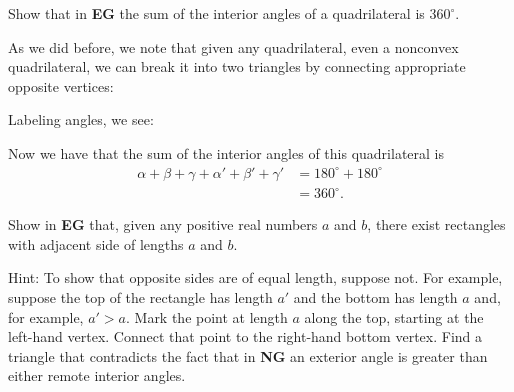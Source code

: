 \documentclass{ximera}
\begin{document}
\begin{question}
Show that in \textbf{EG} the sum of the interior angles of a
quadrilateral is $360^\circ$.
\begin{solution}
As we did before, we note that given any quadrilateral, even a
nonconvex quadrilateral, we can break it into two triangles by
connecting appropriate opposite vertices:
\begin{image}
\end{image}
Labeling angles, we see:
\begin{image}
\end{image}
Now we have that the sum of the interior angles of this quadrilateral
is
\begin{align*}
\alpha + \beta + \gamma + \alpha'+\beta' + \gamma' &= 180^\circ + 180^\circ\\
&= 360^\circ. 
\end{align*}
\end{solution}
\end{question}

\begin{question}\label{112} 
Show in \textbf{EG} that, given any positive real numbers $a$ and $b$,
there exist rectangles with adjacent side of lengths $a$ and $b$.

Hint: To show that opposite sides are of equal length, suppose
not. For example, suppose the top of the rectangle has length
$a'$ and the bottom has length $a$ and, for example,
$a'>a$. Mark the point at length $a$ along the top, starting
at the left-hand vertex. Connect that point to the right-hand bottom
vertex. Find a triangle that contradicts the fact that in \textbf{NG}
an exterior angle is greater than either remote interior angles.
\end{question}
\end{document}
